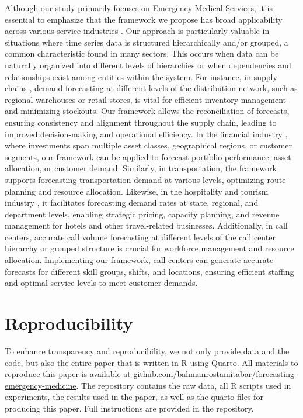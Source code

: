 \documentclass[
  authoryear,
  preprint,
  3p]{elsarticle}
\begin{document}
Although our study primarily focuses on Emergency Medical Services, it
is essential to emphasize that the framework we propose has broad
applicability across various service industries
\citep{ostrom2010moving}. Our approach is particularly valuable in
situations where time series data is structured hierarchically and/or
grouped, a common characteristic found in many sectors. This occurs when
data can be naturally organized into different levels of hierarchies or
when dependencies and relationships exist among entities within the
system. For instance, in supply chains \citep{shugan2000advance}, demand
forecasting at different levels of the distribution network, such as
regional warehouses or retail stores, is vital for efficient inventory
management and minimizing stockouts. Our framework allows the
reconciliation of forecasts, ensuring consistency and alignment
throughout the supply chain, leading to improved decision-making and
operational efficiency. In the financial industry
\citep{kimes1998strategic}, where investments span multiple asset
classes, geographical regions, or customer segments, our framework can
be applied to forecast portfolio performance, asset allocation, or
customer demand. Similarly, in transportation, the framework supports
forecasting transportation demand at various levels, optimizing route
planning and resource allocation. Likewise, in the hospitality and
tourism industry \citep{dekimpe2016impact}, it facilitates forecasting
demand rates at state, regional, and department levels, enabling
strategic pricing, capacity planning, and revenue management for hotels
and other travel-related businesses. Additionally, in call centers,
accurate call volume forecasting at different levels of the call center
hierarchy or grouped structure is crucial for workforce management and
resource allocation. Implementing our framework, call centers can
generate accurate forecasts for different skill groups, shifts, and
locations, ensuring efficient staffing and optimal service levels to
meet customer demands.

\hypertarget{reproducibility}{%
\section*{Reproducibility}\label{reproducibility}}

To enhance transparency and reproducibility, we not only provide data
and the code, but also the entire paper that is written in R using
\href{https://quarto.org/}{Quarto}. All materials to reproduce this
paper is available at
\href{https://github.com/bahmanrostamitabar/forecasting-emergency-medicine}{github.com/bahmanrostamitabar/forecasting-emergency-medicine}.
The repository contains the raw data, all R scripts used in experiments,
the results used in the paper, as well as the quarto files for producing
this paper. Full instructions are provided in the repository.


\renewcommand\refname{References}
  
\end{document}
